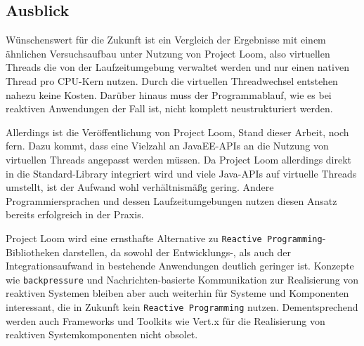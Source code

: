 \subsection{Ausblick}
\label{subsec:ausblick}
Wünschenswert für die Zukunft ist ein Vergleich der Ergebnisse mit einem ähnlichen Versuchsaufbau unter Nutzung von Project Loom,
also virtuellen Threads die von der Laufzeitumgebung verwaltet werden und nur einen nativen Thread pro CPU-Kern nutzen.
Durch die virtuellen Threadwechsel entstehen nahezu keine Kosten. Darüber hinaus muss der Programmablauf, wie es bei reaktiven Anwendungen
der Fall ist, nicht komplett neustrukturiert werden.

Allerdings ist die Veröffentlichung von Project Loom, Stand dieser Arbeit, noch fern. Dazu kommt, dass eine Vielzahl
an JavaEE-APIs an die Nutzung von virtuellen Threads angepasst werden müssen. Da Project Loom allerdings direkt in die Standard-Library
integriert wird und viele Java-APIs auf virtuelle Threads umstellt, ist der Aufwand wohl verhältnismäßg gering.
Andere Programmiersprachen und dessen Laufzeitumgebungen nutzen diesen Ansatz bereits erfolgreich in der Praxis.

Project Loom wird eine ernsthafte Alternative zu \verb|Reactive Programming|-Bibliotheken darstellen, da sowohl der Entwicklungs-, als auch
der Integrationsaufwand in bestehende Anwendungen deutlich geringer ist.
Konzepte wie \verb|backpressure| und Nachrichten-basierte Kommunikation zur Realisierung von reaktiven Systemen
bleiben aber auch weiterhin für Systeme und Komponenten interessant, die in Zukunft kein \verb|Reactive Programming| nutzen.
Dementsprechend werden auch Frameworks und Toolkits wie Vert.x für die Realisierung von reaktiven Systemkomponenten nicht obsolet.